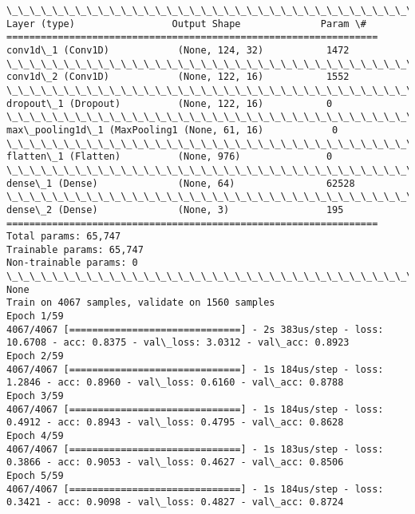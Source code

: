 \documentclass[11pt]{article}
\begin{document}
    \begin{Verbatim}[commandchars=\\\{\}]
\_\_\_\_\_\_\_\_\_\_\_\_\_\_\_\_\_\_\_\_\_\_\_\_\_\_\_\_\_\_\_\_\_\_\_\_\_\_\_\_\_\_\_\_\_\_\_\_\_\_\_\_\_\_\_\_\_\_\_\_\_\_\_\_\_
Layer (type)                 Output Shape              Param \#   
=================================================================
conv1d\_1 (Conv1D)            (None, 124, 32)           1472      
\_\_\_\_\_\_\_\_\_\_\_\_\_\_\_\_\_\_\_\_\_\_\_\_\_\_\_\_\_\_\_\_\_\_\_\_\_\_\_\_\_\_\_\_\_\_\_\_\_\_\_\_\_\_\_\_\_\_\_\_\_\_\_\_\_
conv1d\_2 (Conv1D)            (None, 122, 16)           1552      
\_\_\_\_\_\_\_\_\_\_\_\_\_\_\_\_\_\_\_\_\_\_\_\_\_\_\_\_\_\_\_\_\_\_\_\_\_\_\_\_\_\_\_\_\_\_\_\_\_\_\_\_\_\_\_\_\_\_\_\_\_\_\_\_\_
dropout\_1 (Dropout)          (None, 122, 16)           0         
\_\_\_\_\_\_\_\_\_\_\_\_\_\_\_\_\_\_\_\_\_\_\_\_\_\_\_\_\_\_\_\_\_\_\_\_\_\_\_\_\_\_\_\_\_\_\_\_\_\_\_\_\_\_\_\_\_\_\_\_\_\_\_\_\_
max\_pooling1d\_1 (MaxPooling1 (None, 61, 16)            0         
\_\_\_\_\_\_\_\_\_\_\_\_\_\_\_\_\_\_\_\_\_\_\_\_\_\_\_\_\_\_\_\_\_\_\_\_\_\_\_\_\_\_\_\_\_\_\_\_\_\_\_\_\_\_\_\_\_\_\_\_\_\_\_\_\_
flatten\_1 (Flatten)          (None, 976)               0         
\_\_\_\_\_\_\_\_\_\_\_\_\_\_\_\_\_\_\_\_\_\_\_\_\_\_\_\_\_\_\_\_\_\_\_\_\_\_\_\_\_\_\_\_\_\_\_\_\_\_\_\_\_\_\_\_\_\_\_\_\_\_\_\_\_
dense\_1 (Dense)              (None, 64)                62528     
\_\_\_\_\_\_\_\_\_\_\_\_\_\_\_\_\_\_\_\_\_\_\_\_\_\_\_\_\_\_\_\_\_\_\_\_\_\_\_\_\_\_\_\_\_\_\_\_\_\_\_\_\_\_\_\_\_\_\_\_\_\_\_\_\_
dense\_2 (Dense)              (None, 3)                 195       
=================================================================
Total params: 65,747
Trainable params: 65,747
Non-trainable params: 0
\_\_\_\_\_\_\_\_\_\_\_\_\_\_\_\_\_\_\_\_\_\_\_\_\_\_\_\_\_\_\_\_\_\_\_\_\_\_\_\_\_\_\_\_\_\_\_\_\_\_\_\_\_\_\_\_\_\_\_\_\_\_\_\_\_
None
Train on 4067 samples, validate on 1560 samples
Epoch 1/59
4067/4067 [==============================] - 2s 383us/step - loss: 10.6708 - acc: 0.8375 - val\_loss: 3.0312 - val\_acc: 0.8923
Epoch 2/59
4067/4067 [==============================] - 1s 184us/step - loss: 1.2846 - acc: 0.8960 - val\_loss: 0.6160 - val\_acc: 0.8788
Epoch 3/59
4067/4067 [==============================] - 1s 184us/step - loss: 0.4912 - acc: 0.8943 - val\_loss: 0.4795 - val\_acc: 0.8628
Epoch 4/59
4067/4067 [==============================] - 1s 183us/step - loss: 0.3866 - acc: 0.9053 - val\_loss: 0.4627 - val\_acc: 0.8506
Epoch 5/59
4067/4067 [==============================] - 1s 184us/step - loss: 0.3421 - acc: 0.9098 - val\_loss: 0.4827 - val\_acc: 0.8724

\end{Verbatim}
\end{document}
